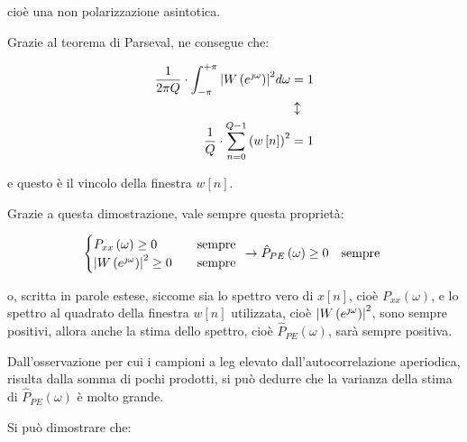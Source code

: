cioè una non polarizzazione asintotica. \newline 

\newpage 

Grazie al teorema di Parseval, ne consegue che: 

{
    \Large 
    \begin{equation}
        \begin{split}
        \dfrac{1}{2 \pi Q}
        \cdot 
        \int_{- \pi}^{+ \pi} 
        \abs{W \left(e^{\jmath \omega}\right)}^{2} 
        d \omega 
        &= 
        1
        \\
        &\updownarrow
        \\
        \dfrac{1}{Q}
        \cdot 
        \sum_{n = 0}^{Q - 1}  
        \left(w \left[ n\right]\right)^{2}
        &= 
        1
        \end{split}
    \end{equation}
}

e questo è il vincolo della finestra $w \left[ n\right]$. \newline 

Grazie a questa dimostrazione, vale sempre questa proprietà: 

{
    \Large 
    \begin{equation}
        \begin{cases}
        P_{xx} \left(\omega\right) \geq 0 \quad &\text{sempre }
        \\
        \abs{W \left(e^{\jmath \omega}\right)}^{2} \geq 0 \quad &\text{sempre }    
        \end{cases}
        \to 
        \hat{P}_{PE} \left(\omega\right) \geq 0 \quad \text{sempre } 
    \end{equation}
}

o, scritta in parole estese, siccome sia lo spettro vero di $x \left[ n\right]$, cioè $P_{xx} \left(\omega\right)$, e lo spettro al quadrato della finestra $w \left[ n\right]$ utilizzata, cioè $\abs{W \left(e^{\jmath \omega}\right)}^{2}$, sono sempre positivi, 
allora anche la stima dello spettro, cioè $\hat{P}_{PE} \left(\omega\right)$, sarà sempre positiva. \newline 

Dall'osservazione per cui i campioni a leg elevato dall'autocorrelazione aperiodica, risulta dalla somma di pochi prodotti, si può dedurre che la varianza della stima di $\hat{P}_{PE} \left(\omega\right)$ è molto grande. \newline 

Si può dimostrare che: 

